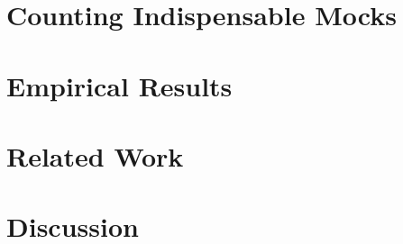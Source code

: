 \documentclass[conference]{IEEEtran}
\begin{document}
\section{Counting Indispensable Mocks}


\section{Empirical Results}


\section{Related Work}


\section{Discussion}




\end{document}
